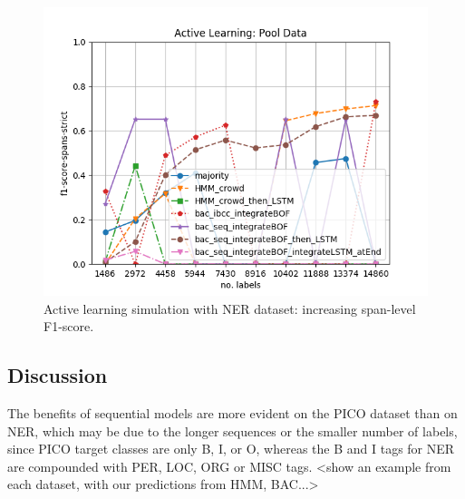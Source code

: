 \begin{figure}
\centering
  \includegraphics[width=1\columnwidth, clip=True, trim=35 0 40 40]{figures/NER_AL/pool/plot_f1-score-spans-strict.png}
\caption{Active learning simulation with NER dataset: increasing span-level F1-score.
}
\label{fig:al}
\end{figure}

\subsection{Discussion}

The benefits of sequential models are more evident on the PICO dataset than on NER, which may be due to the longer sequences or the smaller number of labels, since PICO target classes are only B, I, or O, whereas the B and I tags for NER 
are compounded with PER, LOC, ORG or MISC tags. <show an example from each dataset, with our predictions from HMM, BAC...>
